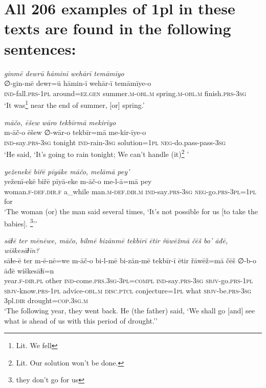 \chapter{All 206 examples of 1pl in these texts are found in the following sentences:}

\ea \label{ZB.7}
\textit{ginmē dewrū hāminī wehārī temāmīyo} \\ 
\gll ∅-gin-mē dewr=ū hāmin-ī wehār-ī temāmīye-o \\ 
 \textsc{ind-}fall\textsc{.prs}\textsc{-1pl} around\textsc{\textsc{=ez.gen}} summer\textsc{.m}\textsc{-obl}\textsc{.m} spring\textsc{.m}\textsc{-obl}\textsc{.m} finish\textsc{.prs}\textsc{-3sg} \\ 
\glt `It was\footnote{Lit. We fell} near the end of summer, [or] spring.'
\z 
 
\ea \label{ZB.15}
\textit{māčo, ēšew wāro tekbīrmā mekirīyo} \\ 
\gll m-āč-o ēšew ∅-wār-o tekbīr=mā me-kir-īye-o \\ 
 \textsc{ind-}say\textsc{.prs}\textsc{-3sg} tonight \textsc{ind-}rain\textsc{-3sg} solution\textsc{=1pl} \textsc{neg-}do.pass-pass\textsc{-3sg} \\ 
\glt `He said, ‘It’s going to rain tonight; We can’t handle (it)\footnote{Lit. Our solution won’t be done.} '
\z 
 
\ea \label{ZB.33}
\textit{yeženekē biřē pīyāke māčo, melāmā pey’} \\ 
\gll yeženī-ekē biřē pīyā-eke m-āč-o me-l-ā=mā pey \\ 
 woman\textsc{.f}\textsc{-def}\textsc{.dir}\textsc{.f} a\_while man\textsc{.m}\textsc{-def}\textsc{.dir}\textsc{.m} \textsc{ind-}say\textsc{.prs}\textsc{-3sg} \textsc{neg-}go\textsc{.prs}\textsc{-3pl}\textsc{=1pl} for \\ 
\glt `The woman (or) the man said several times, ‘It's not possible for us [to take the babies]. \footnote{they don't go for us}’'
\z 
 
\ea \label{ZB.46}
\textit{sāɫē ter mēnēwe, māčo, bilmē bizānmē tekbīrī ētir řāwēžmā čēš bo’ āđē, wiškesāɫīn?} \\ 
\gll sāɫe-ē ter m-ē-nē=we m-āč-o bi-l-mē bi-zān-mē tekbīr-ī ētir řāwēž=mā čēš ∅-b-o āđē wiškesāɫī=n \\ 
 year\textsc{.f}\textsc{-dir}\textsc{.pl} other \textsc{ind-}come\textsc{.prs}\textsc{.3sg}\textsc{-3pl}\textsc{=compl} \textsc{ind-}say\textsc{.prs}\textsc{-3sg} \textsc{sbjv-}go\textsc{.prs}\textsc{-1pl} \textsc{sbjv-}know\textsc{.prs}\textsc{-1pl} advice\textsc{-obl}\textsc{.m} \textsc{disc.ptcl} conjecture\textsc{=1pl} what \textsc{sbjv-}be\textsc{.prs}\textsc{-3sg} 3pl\textsc{.dir} drought\textsc{=cop}\textsc{.3sg}\textsc{.m} \\ 
\glt `The following year, they went back. He (the father) said, ‘We shall go [and] see what is ahead of us with this period of drought.’'
\z 
 
